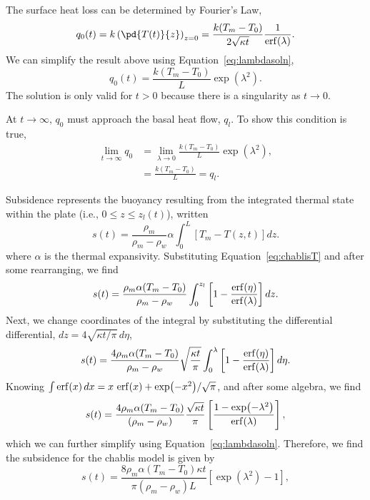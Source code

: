 \documentclass[final,12pt,a4paper]{article}
\begin{document}
The surface heat loss can be determined by Fourier's Law, 
\begin{equation}
    q_{0}(t) = k \left(\pd{T(t)}{z}\right)_{z = 0} =
        \frac{k (T_{m} - T_{0})} {2 \sqrt{\kappa t}} \frac{1}{\erf (\lambda)}.
\end{equation}
We can simplify the result above using Equation~\ref{eq:lambdasoln},
\begin{equation}
    q_{0}(t) = \frac{k (T_{m} - T_{0})} {L} \exp (\lambda^2).
\end{equation}
The solution is only valid for $t > 0$ because there is a singularity as $t \to
0$.

At $t \to \infty$, $q_{0}$ must approach the basal heat flow, $q_{l}$.  To show
this condition is true, 
\begin{align*}
    \lim_{t \to \infty} q_{0} & = \lim_{\lambda \to 0} 
        \frac{k (T_{m} - T_{0})}{L} \exp (\lambda^2), \\
        & = \frac{k (T_{m} - T_{0})}{L} = q_l .
\end{align*}

Subsidence represents the buoyancy resulting from the integrated thermal
state within the plate (i.e., $0 \leq z \leq z_{l}(t)$), written
\begin{equation}
    s(t) = \frac{\rho_{m}}{\rho_{m} - \rho_{w}} \alpha
        \int_{0}^{L} [ T_m - T(z,t) ]  dz .
\end{equation}
where $\alpha$ is the thermal expansivity.  Substituting
Equation~\ref{eq:chablisT} and after some rearranging, we find
\begin{equation*}
    s(t) = \frac{\rho_{m} \alpha (T_{m} - T_{0})}{\rho_{m} - \rho_{w}}
        \int_{0}^{z_{l}} \left[1 - 
        \frac{\erf (\eta)}
        {\erf (\lambda)}
        \right] dz .
\end{equation*}
Next, we change coordinates of the integral by substituting the differential
differential, $dz = 4 \sqrt{\kappa t/\pi}\, d\eta$,
\begin{equation}
    s(t) = \frac{4 \rho_{m} \alpha (T_{m} - T_{0})}{\rho_{m} - \rho_{w}}
        \sqrt{\frac{\kappa t}{\pi}}
        \int_{0}^{\lambda} \left[1 - \frac{\erf( \eta)}
        {\erf(\lambda)}\right] d\eta .
\end{equation}
Knowing $\int \erf(x)\, dx = x\, \erf(x) + \exp(-x^2)/\sqrt{\pi}$,
and after some algebra, we find
\begin{equation*}
    s(t) = \frac{4 \rho_{m} \alpha (T_{m} - T_{0})}{(\rho_{m} - \rho_{w})}
        \frac{\sqrt{\kappa t}}{\pi}
        \left[ \frac{1 - \exp(-\lambda^{2})}{\erf(\lambda)} \right] ,
\end{equation*}
which we can further simplify using Equation~\ref{eq:lambdasoln}.  Therefore, we
find the subsidence for the chablis model is given by
\begin{equation}
    s(t) = \frac{8 \rho_{m} \alpha (T_{m} - T_{0}) \kappa t}
        {\pi (\rho_{m} - \rho_{w}) L}
        \left[ \exp (\lambda^{2}) - 1 \right] ,
\end{equation}




\end{document}
